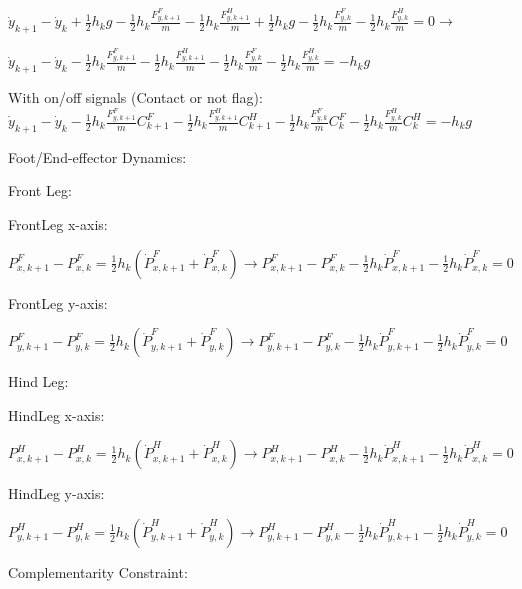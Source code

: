 \documentclass[a4paper,10pt]{article}
\begin{document}
$\dot{y}_{k+1}-\dot{y}_k + \frac{1}{2}h_kg - \frac{1}{2}h_k\frac{F^F_{y,k+1}}{m} - \frac{1}{2}h_k\frac{F^H_{y,k+1}}{m} + \frac{1}{2}h_kg - \frac{1}{2}h_k\frac{F^F_{y,k}}{m} - \frac{1}{2}h_k\frac{F^H_{y,k}}{m} = 0 \rightarrow$

$\dot{y}_{k+1}-\dot{y}_k  - \frac{1}{2}h_k\frac{F^F_{y,k+1}}{m} - \frac{1}{2}h_k\frac{F^H_{y,k+1}}{m}  - \frac{1}{2}h_k\frac{F^F_{y,k}}{m} - \frac{1}{2}h_k\frac{F^H_{y,k}}{m} = - h_kg$

With on/off signals (Contact or not flag):
$\dot{y}_{k+1}-\dot{y}_k  - \frac{1}{2}h_k\frac{F^F_{y,k+1}}{m}C^F_{k+1} - \frac{1}{2}h_k\frac{F^H_{y,k+1}}{m}C^H_{k+1}  - \frac{1}{2}h_k\frac{F^F_{y,k}}{m}C^F_{k} - \frac{1}{2}h_k\frac{F^H_{y,k}}{m}C^H_{k} = - h_kg$

\vspace{3mm}

Foot/End-effector Dynamics:

Front Leg:

FrontLeg x-axis: 

$P^F_{x,k+1}-P^F_{x,k} = \frac{1}{2}h_k(\dot{P}^F_{x,k+1}+\dot{P}^F_{x,k}) \rightarrow P^F_{x,k+1}-P^F_{x,k} - \frac{1}{2}h_k\dot{P}^F_{x,k+1} - \frac{1}{2}h_k\dot{P}^F_{x,k}  = 0$

\vspace{2mm}

FrontLeg y-axis:

$P^F_{y,k+1}-P^F_{y,k} = \frac{1}{2}h_k(\dot{P}^F_{y,k+1}+\dot{P}^F_{y,k}) \rightarrow P^F_{y,k+1}-P^F_{y,k} - \frac{1}{2}h_k\dot{P}^F_{y,k+1} - \frac{1}{2}h_k\dot{P}^F_{y,k}  = 0$

\vspace{3mm}

Hind Leg:

HindLeg x-axis:

$P^H_{x,k+1}-P^H_{x,k} = \frac{1}{2}h_k(\dot{P}^H_{x,k+1}+\dot{P}^H_{x,k}) \rightarrow P^H_{x,k+1}-P^H_{x,k} - \frac{1}{2}h_k\dot{P}^H_{x,k+1} - \frac{1}{2}h_k\dot{P}^H_{x,k}  = 0$

\vspace{2mm}

HindLeg y-axis:

$P^H_{y,k+1}-P^H_{y,k} = \frac{1}{2}h_k(\dot{P}^H_{y,k+1}+\dot{P}^H_{y,k}) \rightarrow P^H_{y,k+1}-P^H_{y,k} - \frac{1}{2}h_k\dot{P}^H_{y,k+1} - \frac{1}{2}h_k\dot{P}^H_{y,k}  = 0$

\vspace{3mm}

Complementarity Constraint:
\vspace{2mm}
\end{document}
